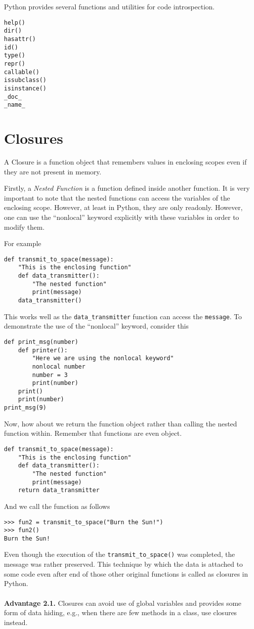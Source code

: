 \documentclass[a4paper,oneside]{book}
\numberwithin{equation}{chapter}
\begin{document}
Python provides several functions and utilities for code introspection.
\begin{verbatim}
help()
dir()
hasattr()
id()
type()
repr()
callable()
issubclass()
isinstance()
_doc_
_name_
\end{verbatim}
\section{Closures}
A Closure is a function object that remembers values in enclosing scopes even if they are not present in memory.

Firstly, a \textit{Nested Function} is a function defined inside another function. It is very important to note that the nested functions can access the variables of the enclosing scope. However, at least in Python, they are only readonly. However, one can use the ``nonlocal'' keyword explicitly with these variables in order to modify them.

For example
\begin{verbatim}
def transmit_to_space(message):
    "This is the enclosing function"
    def data_transmitter():
        "The nested function"
        print(message)
    data_transmitter()
\end{verbatim}
This works well as the \verb|data_transmitter| function can access the \texttt{message}. To demonstrate the use of the ``nonlocal'' keyword, consider this
\begin{verbatim}
def print_msg(number)
    def printer():
        "Here we are using the nonlocal keyword"
        nonlocal number
        number = 3
        print(number)
    print()
    print(number)
print_msg(9)
\end{verbatim}

Now, how about we return the function object rather than calling the nested function within. Remember that functions are even object.
\begin{verbatim}
def transmit_to_space(message):
    "This is the enclosing function"
    def data_transmitter():
        "The nested function"
        print(message)
    return data_transmitter
\end{verbatim}
And we call the function as follows
\begin{verbatim}
>>> fun2 = transmit_to_space("Burn the Sun!")
>>> fun2()
Burn the Sun!
\end{verbatim}

Even though the execution of the \verb|transmit_to_space()| was completed, the message was rather preserved. This technique by which the data is attached to some code even after end of those other original functions is called as closures in Python.\\
\\
\textbf{Advantage 2.1.} Closures can avoid use of global variables and provides some form of data hiding, e.g., when there are few methods in a class, use closures instead.
\end{document}
